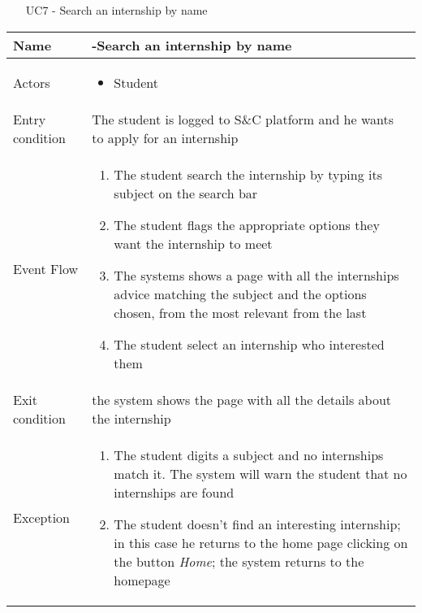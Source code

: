 				\begin{table} [H]
					\centering
					\begin{itemize}
						\item [UC7] - Search an internship by name 
					\end{itemize}
					\begin{tabular}{|| P{7.5cm} | P{7.5cm} ||}
						\hline
						Name & -Search an internship by name \\
						\hline
						Actors & \parbox{5cm}{\begin{itemize}
								\item Student
							\end{itemize}
						} \\
						\hline
						Entry condition & The student is logged to S\&C platform and he wants to apply for an internship \\
						\hline
						Event Flow & \parbox{5cm}{\begin{enumerate}
								\item The student search the internship 
								by typing its subject on the search 
								bar 
								\item The student flags the appropriate 
								options they want the internship to 
								meet  
								\item The systems shows a page with all 
								the internships advice matching 
								the subject and the options chosen, from the most relevant from the last
								\item The student select an internship who 
								interested them
						\end{enumerate}} \\
						\hline 
						Exit condition &  the system shows the 
						page with all the details about the 
						internship \\
						\hline
						Exception & \parbox{5cm}{\begin{enumerate}
								\item The student digits a subject and no 
								internships match it. The system 
								will warn the student that no 
								internships are found 
								\item The student doesn’t find an 
								interesting internship; in this case 
								he returns to the home page 
								clicking on the button \textit{Home}; the 
								system returns to the homepage
								\end{enumerate}} \\
						\hline
					\end{tabular}
				\end{table}
				
